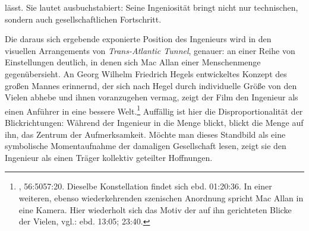 \documentclass[%
	fontsize=10pt,%
	twoside,%
	headings=optiontoheadandtoc,%
	showtrims]{scrbook}
\begin{document}
lässt. Sie lautet ausbuchstabiert: Seine Ingeniosität bringt nicht nur technischen, sondern auch gesellschaftlichen Fortschritt.\par Die daraus sich ergebende exponierte Position des Ingenieurs wird in den visuellen Arrangements von \emph{Trans-Atlantic Tunnel}, genauer: an einer Reihe von Einstellungen deutlich, in denen sich Mac Allan einer Menschenmenge gegenübersieht. An Georg Wilhelm Friedrich Hegels entwickeltes Konzept des großen Mannes erinnernd, der sich nach Hegel durch individuelle Größe von den Vielen abhebe und ihnen voranzugehen vermag, zeigt der Film den Ingenieur als einen Anführer in eine bessere Welt.\footnote{\cite[][]{elevy1935a}, 56:50\textendash{}57:20. Dieselbe Konstellation findet sich ebd. 01:20:36. In einer weiteren, ebenso wiederkehrenden szenischen Anordnung spricht Mac Allan in eine Kamera. Hier wiederholt sich das Motiv der auf ihn gerichteten Blicke der Vielen, vgl.: ebd. 13:05; 23:40.}  Auffällig ist hier die Disproportionalität der Blickrichtungen: Während der Ingenieur in die Menge blickt, blickt die Menge auf ihn, das Zentrum der Aufmerksamkeit. Möchte man dieses Standbild als eine symbolische Momentaufnahme der damaligen Gesellschaft lesen, zeigt sie den Ingenieur als einen Träger kollektiv geteilter Hoffnungen.
\end{document}
